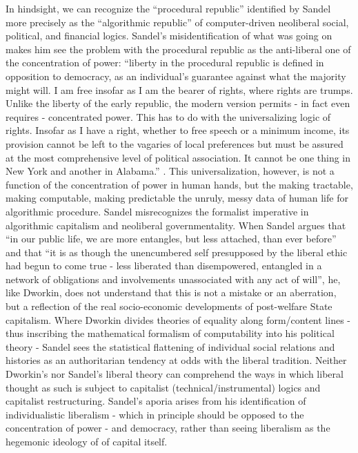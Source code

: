 \documentclass[12pt,oneside]{memoir}
\begin{document}
In hindsight, we can recognize the ``procedural republic'' identified by Sandel more precisely as the ``algorithmic republic'' of computer-driven neoliberal social, political, and financial logics. Sandel's misidentification of what was going on makes him see the problem with the procedural republic as the anti-liberal one of the concentration of power: ``liberty in the procedural republic is defined in opposition to democracy, as an individual's guarantee against what the majority might will. I am free insofar as I am the bearer of rights, where rights are trumps. Unlike the liberty of the early republic, the modern version permits - in fact even requires - concentrated power. This has to do with the universalizing logic of rights. Insofar as I have a right, whether to free speech or a minimum income, its provision cannot be left to the vagaries of local preferences but must be assured at the most comprehensive level of political association. It cannot be one thing in New York and another in Alabama.'' \cite[93-95]{Sandel1984}. This universalization, however, is not a function of the concentration of power in human hands, but the making tractable, making computable, making predictable the unruly, messy data of human life for algorithmic procedure. Sandel misrecognizes the formalist imperative in algorithmic capitalism and neoliberal governmentality. When Sandel argues that ``in our public life, we are more entangles, but less attached, than ever before'' and that ``it is as though the unencumbered self presupposed by the liberal ethic had begun to come true - less liberated than disempowered, entangled in a network of obligations and involvements unassociated with any act of will'', he, like Dworkin, does not understand that this is not a mistake or an aberration, but a reflection of the real socio-economic developments of post-welfare State capitalism. Where Dworkin divides theories of equality along form/content lines - thus inscribing the mathematical formalism of computability into his political theory - Sandel sees the statistical flattening of individual social relations and histories as an authoritarian tendency at odds with the liberal tradition.  Neither Dworkin's nor Sandel's liberal theory can comprehend the ways in which liberal thought as such is subject to capitalist (technical/instrumental) logics and capitalist restructuring. Sandel's aporia arises from his identification of individualistic liberalism - which in principle should be opposed to the concentration of power - and democracy, rather than seeing liberalism as the hegemonic ideology of of capital itself. 
\end{document}
